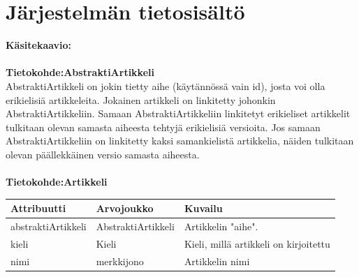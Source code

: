 \documentclass[12pt]{article}
\begin{document}
  \section{Järjestelmän tietosisältö}
        \textbf{Käsitekaavio:} \\
         \\

        \textbf{Tietokohde:AbstraktiArtikkeli} \\
        AbstraktiArtikkeli on jokin tietty aihe (käytännössä vain id), josta voi olla erikielisiä artikkeleita. Jokainen artikkeli on linkitetty johonkin AbstraktiArtikkeliin. Samaan AbstraktiArtikkeliin linkitetyt erikieliset artikkelit tulkitaan olevan samasta aiheesta tehtyjä erikielisiä versioita. Jos samaan AbstraktiArtikkeliin on linkitetty kaksi samankielistä artikkelia, näiden tulkitaan olevan päällekkäinen versio samasta aiheesta. \\ \\
        \textbf{Tietokohde:Artikkeli}\\
        \begin{tabular}{|p{8em}|p{8em}|p{13em}|} \hline
            \textbf{Attribuutti} & \textbf{Arvojoukko} & \textbf{Kuvailu} \\ \hline
                    abstraktiArtikkeli
                &   AbstraktiArtikkeli
                &   Artikkelin "aihe".
            \\ \hline
                    kieli
                &   Kieli
                &   Kieli, millä artikkeli on kirjoitettu
            \\ \hline
                    nimi
                &   merkkijono
                &   Artikkelin nimi
            \\ \hline
        \end{tabular} \\ \\ \\
\end{document}
